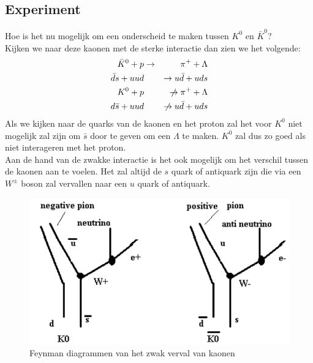 \documentclass[../main.tex]{subfiles}
\begin{document}
\subsection{Experiment}%
\label{sub:experiment}

Hoe is het nu mogelijk om een onderscheid te maken tussen $K^0$ en $\bar{K}^0$?\\
Kijken we naar deze kaonen met de sterke interactie dan zien we het volgende:
\begin{equation}
    \begin{aligned}
        \label{eq:kaon_sterke_int}
        \bar{K}^{0}+p &\rightarrow & \pi^{+}+\Lambda \\
        \bar{d} s+u u d & &\rightarrow u \bar{d}+u d s \\
        K^{0}+p & &\centernot\rightarrow \pi^{+}+\Lambda \\
        d \bar{s}+u u d & &\centernot\rightarrow u \bar{d}+u d s
    \end{aligned}
\end{equation}
Als we kijken naar de quarks van de kaonen en het proton zal het voor $K^0$ niet mogelijk zal zijn om $\bar{s}$ door te geven om een $\Lambda$ te maken. $K^0$ zal dus zo goed als niet interageren met het proton.\\
Aan de hand van de zwakke interactie is het ook mogelijk om het verschil tussen de kaonen aan te voelen. Het zal altijd de $s$ quark of antiquark zijn die via een $W^\pm$ boson zal vervallen naar een $u$ quark of antiquark.

\begin{figure}[h]
    \centering
    \includegraphics[width=0.4\linewidth]{meson_mixing_and_oscillations/kaon_zwak_verval.png}
    \caption{Feynman diagrammen van het zwak verval van kaonen}%
    \label{fig:meson_mixing_and_oscillations/kaon_zwak_verval}
\end{figure}
\end{document}
